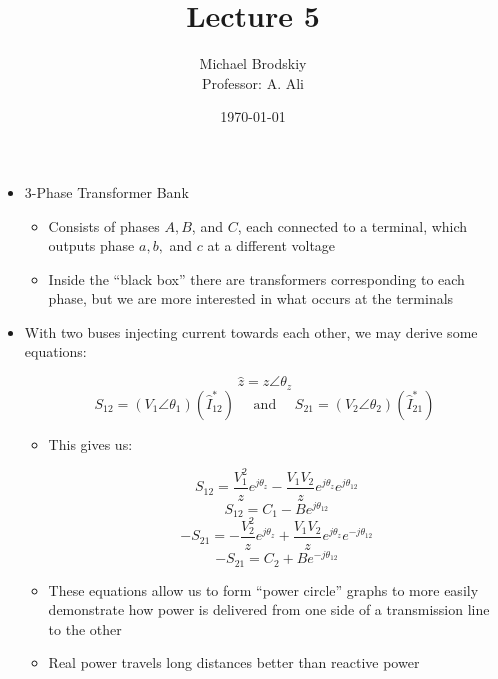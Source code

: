 


\title{Lecture 5}
\date{\today}
\author{Michael Brodskiy\\ \small Professor: A. Ali}



\maketitle

\begin{itemize}

  \item 3-Phase Transformer Bank

    \begin{itemize}

      \item Consists of phases $A, B$, and $C$, each connected to a terminal, which outputs phase $a, b,$ and $c$ at a different voltage

      \item Inside the ``black box'' there are transformers corresponding to each phase, but we are more interested in what occurs at the terminals

    \end{itemize}

  \item With two buses injecting current towards each other, we may derive some equations:

    $$\hat{z}=z\angle\theta_z$$
    $$S_{12}=(V_1\angle\theta_1)(\hat{I}_{12}^*)\quad\text{ and }\quad S_{21}=(V_2\angle\theta_2)(\hat{I}_{21}^*)$$

    \begin{itemize}

      \item This gives us:

        $$S_{12}=\frac{V_1^2}{z}e^{j\theta_z}-\frac{V_1V_2}{z}e^{j\theta_z}e^{j\theta_{12}}$$
        $$S_{12}=C_1-Be^{j\theta_{12}}$$
        $$-S_{21}=-\frac{V_2^2}{z}e^{j\theta_z}+\frac{V_1V_2}{z}e^{j\theta_z}e^{-j\theta_{12}}$$
        $$-S_{21}=C_2+Be^{-j\theta_{12}}$$

      \item These equations allow us to form ``power circle'' graphs to more easily demonstrate how power is delivered from one side of a transmission line to the other

      \item Real power travels long distances better than reactive power

    \end{itemize}

\end{itemize}



